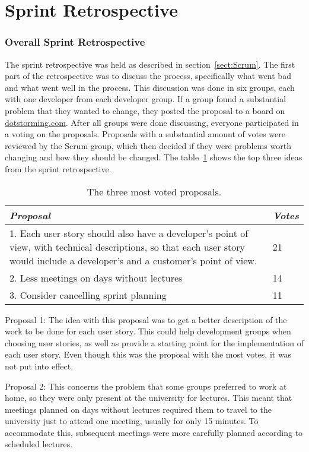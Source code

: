 \section{Sprint Retrospective}
\label{sect:RetrospectiveSprint1}
\subsubsection{Overall Sprint Retrospective}
\label{sect:TeamRetrospectiveSprint1}
The sprint retrospective was held as described in section~\ref{sect:Scrum}. The first part of the retrospective was to discuss the process, specifically what went bad and what went well in the process. This discussion was done in six groups, each with one developer from each developer group. 
If a group found a substantial problem that they wanted to change, they posted the proposal to a board on \url{dotstorming.com}. After all groups were done discussing, everyone participated in a voting on the proposals. 
Proposals with a substantial amount of votes were reviewed by the Scrum group, which then decided if they were problems worth changing and how they should be changed.
The table~\ref{table:retrospectiveIdeas} shows the top three ideas from the sprint retrospective.

\begin{table}[htbp]
\begin{tabularx}{\textwidth}{X|l}
\textit{Proposal}    & \textit{Votes}  \\ \hline
1. Each user story should also have a developer's point of view, with technical descriptions, so that each user story would include a developer's and a customer's point of view.  & 21  \\ \hline
2. Less meetings on days without lectures & 14 \\ \hline
3. Consider cancelling sprint planning & 11  \\ \hline
\end{tabularx}
\caption{The three most voted proposals.}
\label{table:retrospectiveIdeas}
\end{table}

Proposal 1: The idea with this proposal was to get a better description of the work to be done for each user story. This could help development groups when choosing user stories, as well as provide a starting point for the implementation of each user story. Even though this was the proposal with the most votes, it was not put into effect. 

Proposal 2: This concerns the problem that some groups preferred to work at home, so they were only present at the university for lectures. This meant that meetings planned on days without lectures required them to travel to the university just to attend one meeting, usually for only 15 minutes. To accommodate this, subsequent meetings were more carefully planned according to scheduled lectures. 


